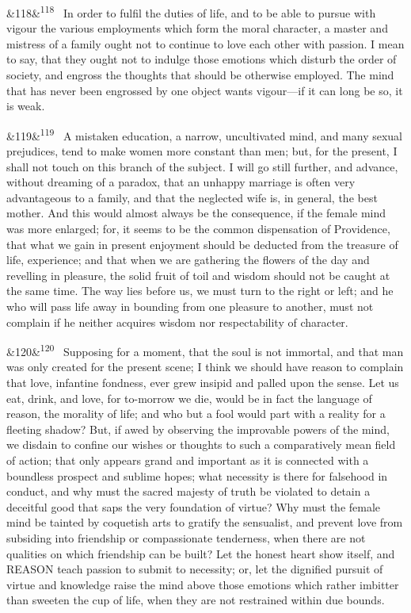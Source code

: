\documentclass[12pt]{article}
\newcommand{\para}[1][]{\par\noindent\ifx&#1&\else\textsuperscript{\footnotesize #1}~\fi}
\begin{document}
\para[118] In order to fulfil the duties of life, and to be able to pursue with vigour the various employments which form the moral character, a master and mistress of a family ought not to continue to love each other with passion. I mean to say, that they ought not to indulge those emotions which disturb the order of society, and engross the thoughts that should be otherwise employed. The mind that has never been engrossed by one object wants vigour---if it can long be so, it is weak.

\para[119] A mistaken education, a narrow, uncultivated mind, and many sexual prejudices, tend to make women more constant than men; but, for the present, I shall not touch on this branch of the subject. I will go still further, and advance, without dreaming of a paradox, that an unhappy marriage is often very advantageous to a family, and that the neglected wife is, in general, the best mother. And this would almost always be the consequence, if the female mind was more enlarged; for, it seems to be the common dispensation of Providence, that what we gain in present enjoyment should be deducted from the treasure of life, experience; and that when we are gathering the flowers of the day and revelling in pleasure, the solid fruit of toil and wisdom should not be caught at the same time. The way lies before us, we must turn to the right or left; and he who will pass life away in bounding from one pleasure to another, must not complain if he neither acquires wisdom nor respectability of character.

\para[120] Supposing for a moment, that the soul is not immortal, and that man was only created for the present scene; I think we should have reason to complain that love, infantine fondness, ever grew insipid and palled upon the sense. Let us eat, drink, and love, for to-morrow we die, would be in fact the language of reason, the morality of life; and who but a fool would part with a reality for a fleeting shadow? But, if awed by observing the improvable powers of the mind, we disdain to confine our wishes or thoughts to such a comparatively mean field of action; that only appears grand and important as it is connected with a boundless prospect and sublime hopes; what necessity is there for falsehood in conduct, and why must the sacred majesty of truth be violated to detain a deceitful good that saps the very foundation of virtue? Why must the female mind be tainted by coquetish arts to gratify the sensualist, and prevent love from subsiding into friendship or compassionate tenderness, when there are not qualities on which friendship can be built? Let the honest heart show itself, and REASON teach passion to submit to necessity; or, let the dignified pursuit of virtue and knowledge raise the mind above those emotions which rather imbitter than sweeten the cup of life, when they are not restrained within due bounds.
\end{document}
